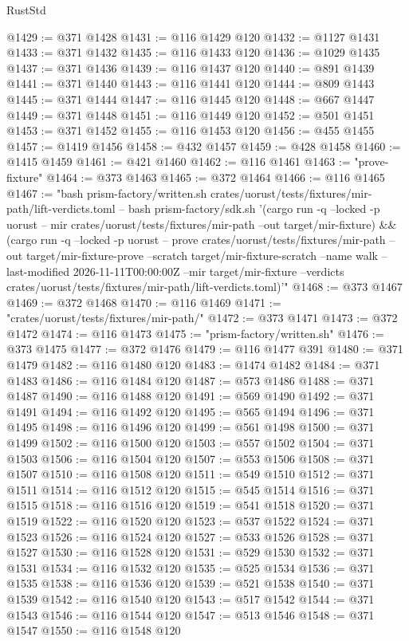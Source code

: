 \begin{lexlean}{RustStd}
\begin{coremodule}
@1429 := @371 @1428
@1431 := @116 @1429 @120
@1432 := @1127 @1431
@1433 := @371 @1432
@1435 := @116 @1433 @120
@1436 := @1029 @1435
@1437 := @371 @1436
@1439 := @116 @1437 @120
@1440 := @891 @1439
@1441 := @371 @1440
@1443 := @116 @1441 @120
@1444 := @809 @1443
@1445 := @371 @1444
@1447 := @116 @1445 @120
@1448 := @667 @1447
@1449 := @371 @1448
@1451 := @116 @1449 @120
@1452 := @501 @1451
@1453 := @371 @1452
@1455 := @116 @1453 @120
@1456 := @455 @1455
@1457 := @1419 @1456
@1458 := @432 @1457
@1459 := @428 @1458
@1460 := @1415 @1459
@1461 := @421 @1460
@1462 := @116 @1461
@1463 := "prove-fixture"
@1464 := @373 @1463
@1465 := @372 @1464
@1466 := @116 @1465
@1467 := "bash prism-factory/written.sh crates/uorust/tests/fixtures/mir-path/lift-verdicts.toml -- bash prism-factory/sdk.sh '(cargo run -q --locked -p uorust -- mir crates/uorust/tests/fixtures/mir-path --out target/mir-fixture) && (cargo run -q --locked -p uorust -- prove crates/uorust/tests/fixtures/mir-path --out target/mir-fixture-prove --scratch target/mir-fixture-scratch --name walk --last-modified 2026-11-11T00:00:00Z --mir target/mir-fixture --verdicts crates/uorust/tests/fixtures/mir-path/lift-verdicts.toml)'"
@1468 := @373 @1467
@1469 := @372 @1468
@1470 := @116 @1469
@1471 := "crates/uorust/tests/fixtures/mir-path/"
@1472 := @373 @1471
@1473 := @372 @1472
@1474 := @116 @1473
@1475 := "prism-factory/written.sh"
@1476 := @373 @1475
@1477 := @372 @1476
@1479 := @116 @1477 @391
@1480 := @371 @1479
@1482 := @116 @1480 @120
@1483 := @1474 @1482
@1484 := @371 @1483
@1486 := @116 @1484 @120
@1487 := @573 @1486
@1488 := @371 @1487
@1490 := @116 @1488 @120
@1491 := @569 @1490
@1492 := @371 @1491
@1494 := @116 @1492 @120
@1495 := @565 @1494
@1496 := @371 @1495
@1498 := @116 @1496 @120
@1499 := @561 @1498
@1500 := @371 @1499
@1502 := @116 @1500 @120
@1503 := @557 @1502
@1504 := @371 @1503
@1506 := @116 @1504 @120
@1507 := @553 @1506
@1508 := @371 @1507
@1510 := @116 @1508 @120
@1511 := @549 @1510
@1512 := @371 @1511
@1514 := @116 @1512 @120
@1515 := @545 @1514
@1516 := @371 @1515
@1518 := @116 @1516 @120
@1519 := @541 @1518
@1520 := @371 @1519
@1522 := @116 @1520 @120
@1523 := @537 @1522
@1524 := @371 @1523
@1526 := @116 @1524 @120
@1527 := @533 @1526
@1528 := @371 @1527
@1530 := @116 @1528 @120
@1531 := @529 @1530
@1532 := @371 @1531
@1534 := @116 @1532 @120
@1535 := @525 @1534
@1536 := @371 @1535
@1538 := @116 @1536 @120
@1539 := @521 @1538
@1540 := @371 @1539
@1542 := @116 @1540 @120
@1543 := @517 @1542
@1544 := @371 @1543
@1546 := @116 @1544 @120
@1547 := @513 @1546
@1548 := @371 @1547
@1550 := @116 @1548 @120

\end{coremodule}
\end{lexlean}
